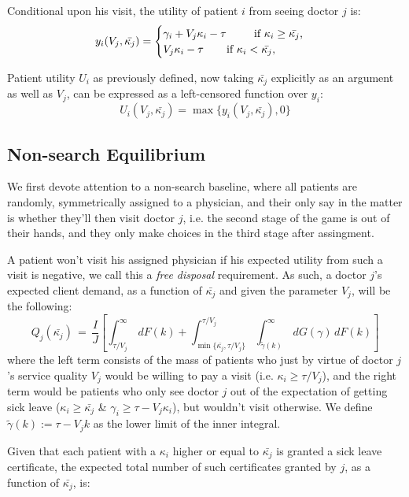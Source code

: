 \documentclass[../main.tex]{subfiles}
\begin{document}
Conditional upon his visit, the utility of patient $i$ from seeing doctor $j$ is:
\[
    y_i(V_j,\bar{\kappa_j}) =\begin{cases}
    \gamma_i + V_j \kappa_i - \tau \text{  \hspace{0.65cm} if $\kappa_i \geq \bar{\kappa_j}$,} \\
    V_j \kappa_i - \tau \text{  \hspace{0.5cm} if $\kappa_i < \bar{\kappa_j}$,}
    \end{cases}
\]

Patient utility $U_i$ as previously defined, now taking $\bar{\kappa_j}$ explicitly as an argument as well as $V_j$, can be expressed as a left-censored function over $y_i$:
\[
U_i(V_j,\bar{\kappa_j}) =  \operatorname{max} \{y_i(V_j,\bar{\kappa_j}),0\}
\]

\subsection{Non-search Equilibrium}

We first devote attention to a non-search baseline, where all patients are randomly, symmetrically assigned to a physician, and their only say in the matter is whether they’ll then visit doctor $j$, i.e. the second stage of the game is out of their hands, and they only make choices in the third stage after assingment.

A patient won't visit his assigned physician if his expected utility from such a visit is negative, we call this a \textit{free disposal} requirement. As such, a doctor $j$’s expected client demand, as a function of $\bar{\kappa_j}$ and given the parameter $V_j$, will be the following:
\begin{equation}
    Q_j(\bar{\kappa_j}) \,=\, \frac{I}{J}\left[ \int_{\tau/V_j}^{\infty}\,dF(k) +  \int_{\min\{\bar{\kappa_j},\tau/V_j\}}^{\tau/V_j} \int_{\tilde{\gamma}(k)}^{\infty} \,dG(\gamma) \,dF(k) \right] \tag{N.1}\label{eq:ns_Q}
\end{equation}
where the left term consists of the mass of patients who just by virtue of doctor $j$’s service quality $V_j$ would be willing to pay a visit (i.e. $\kappa_i \geq \tau/V_j$), and the right term would be patients who only see doctor $j$ out of the expectation of getting sick leave ($\kappa_i \geq \bar{\kappa_j}$ \& $\gamma_i \geq \tau - V_j \kappa_i$), but wouldn’t visit otherwise. We define $\tilde{\gamma}(k) := \tau - V_j k$ as the lower limit of the inner integral.

Given that each patient with a $\kappa_i$ higher or equal to $\bar{\kappa_j}$ is granted a sick leave certificate, the expected total number of such certificates granted by $j$, as a function of $\bar{\kappa_j}$, is:
\end{document}
